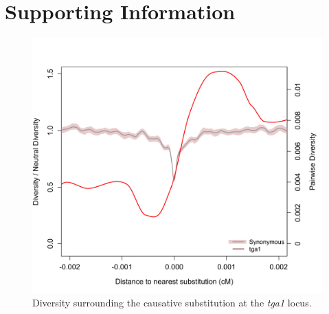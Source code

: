 \section*{Supporting Information}
\renewcommand\thefigure{S\arabic{figure}}
\renewcommand\thetable{S\arabic{table}}    
\setcounter{figure}{0}
\setcounter{table}{0}


\begin{figure}[h]
  \begin{center}
    \includegraphics[width=\textwidth]{FigsAndFiles/plotDiversity_TvM_Folded2_Significance_tga1Supp_June.png}
    \end{center}
\caption{Diversity surrounding the causative substitution at the \emph{tga1} locus.  \label{sFig:tga1}}
\end{figure}
\clearpage


